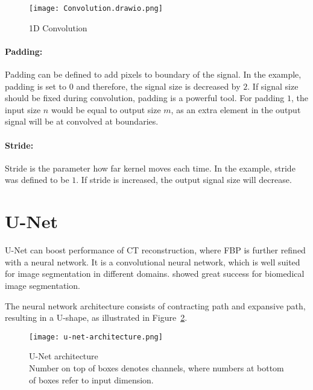 \begin{figure}[H]
  \centering
  \texttt{[image: Convolution.drawio.png]}
  \caption{1D Convolution}
  \label{fig:1d-convolution}
\end{figure}

\paragraph{Padding:} 


Padding can be defined to add pixels to boundary of the signal.
In the example, padding is set to $0$ and therefore, the signal size is decreased by $2$.
If signal size should be fixed during convolution, padding is a powerful tool. For padding $1$,
the input size $n$ would be equal to output size $m$, as an extra element in the output signal
will be at convolved at boundaries.


\paragraph{Stride:}
Stride is the parameter how far kernel moves each time. In the example, stride was defined to be $1$.
If stride is increased, the output signal size will decrease.

\section{U-Net}
\label{sec:unet}
U-Net can boost performance of CT reconstruction, where FBP is further refined with a neural network.
It is a convolutional neural network, which is well suited for image segmentation in different domains.
\cite{unet-tomography} showed great success for biomedical image segmentation.

The neural network architecture consists of contracting path and expansive path,
resulting in a U-shape, as illustrated in Figure~\ref{fig:u-net-architectue}.

\begin{figure}[H]
  \centering
  \texttt{[image: u-net-architecture.png]}
  \caption{
    U-Net architecture \cite[p 2, Fig. 1]{unet-tomography} \\
    Number on top of boxes denotes channels, where numbers at bottom of boxes refer to input dimension.
    }
    \label{fig:u-net-architectue}
\end{figure}


